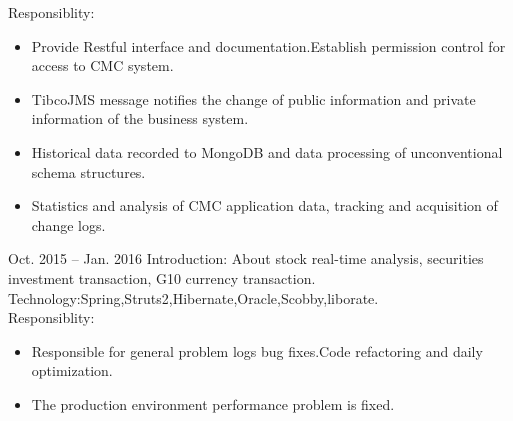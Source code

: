 \documentclass{resume}
\begin{document}
Responsiblity:
\begin{itemize}
\item Provide Restful interface and documentation.Establish permission control for access to CMC system. 
\item TibcoJMS message notifies the change of public information and private information of the business system.
\item Historical data recorded to MongoDB and data processing of unconventional schema structures.
\item Statistics and analysis of CMC application data, tracking and acquisition of change logs.
\end{itemize}
 {Oct. 2015 -- Jan. 2016}
Introduction: About stock real-time analysis, securities investment transaction, G10 currency transaction.\\
Technology:Spring,Struts2,Hibernate,Oracle,Scobby,liborate.\\
Responsiblity:
\begin{itemize}
\item Responsible for general problem logs bug fixes.Code refactoring and daily optimization.
\item The production environment performance problem is fixed.
\end{itemize}
\end{document}
